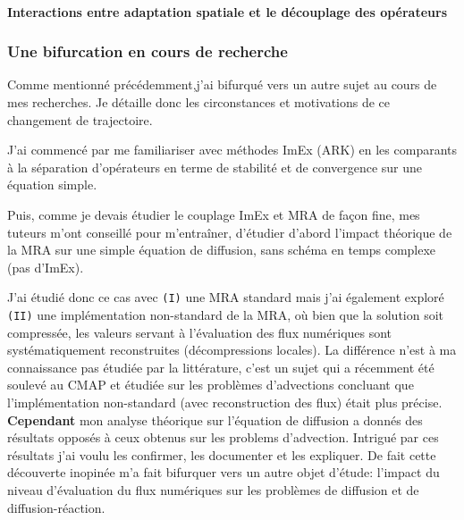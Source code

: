     \paragraph{Interactions entre adaptation spatiale et le découplage des opérateurs}

    \subsubsection{Une bifurcation en cours de recherche}
        Comme mentionné précédemment,j'ai bifurqué vers un autre sujet au cours de mes recherches. Je détaille donc les circonstances et motivations de ce changement de trajectoire.\par 

        J'ai commencé par me familiariser avec méthodes ImEx (ARK) en les comparants à la séparation d'opérateurs en terme de stabilité et de convergence sur une équation simple.
        
        Puis, comme je devais étudier le couplage ImEx et MRA de façon fine, mes tuteurs m'ont conseillé pour m’entraîner, 
        d'étudier d'abord l'impact théorique de la MRA sur une simple équation de diffusion, sans schéma en temps complexe (pas d'ImEx).

        J'ai étudié donc ce cas avec \texttt{(I)} une MRA standard mais j'ai également exploré \texttt{(II)} une implémentation non-standard de la MRA, où bien que la solution soit compressée, 
        les valeurs servant à l'évaluation des flux numériques sont systématiquement reconstruites (décompressions locales).
        La différence n'est à ma connaissance pas étudiée par la littérature, 
        c'est un sujet qui a récemment été soulevé au CMAP et étudiée sur les problèmes d’advections \cite{belloti_et_al_2025} 
        concluant que l'implémentation non-standard (avec reconstruction des flux) était plus précise.
        \textbf{Cependant} mon analyse théorique sur l'équation de diffusion a donnés des résultats opposés à ceux obtenus sur les problems d'advection.
        Intrigué par ces résultats j'ai voulu les confirmer, les documenter et les expliquer. De fait cette découverte inopinée m'a fait bifurquer vers un autre objet d'étude: 
        l'impact du niveau d'évaluation du flux numériques sur les problèmes de diffusion et de diffusion-réaction. 
